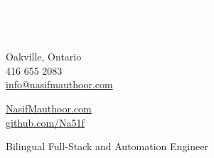 \documentclass[9pt]{src/developercv} %
\begin{document}

\begin{minipage}[t]{0.45\textwidth} %
	\vspace{-\baselineskip} %
	
	\colorbox{SteelBlue4}{{\HUGE\textcolor{white}{\textbf{\MakeUppercase{Nasif}}}}} %
	
	\colorbox{SteelBlue3}{{\HUGE\textcolor{white}{\textbf{\MakeUppercase{Mauthoor}}}}} %
	
	\vspace{6pt}
	
\end{minipage}
\begin{minipage}[t]{0.275\textwidth} %
	\vspace{-\baselineskip} %
	
	{\color{SteelBlue3}\faMapMarker} \hspace{0.2cm} Oakville, Ontario\\
	{\color{SteelBlue4}\faPhone} \hspace{0.2cm} 416 655 2083\\
	{\color{SteelBlue2}\faAt} \hspace{0.2cm} \href{mailto:info@nasifmauthoor.com}{info@nasifmauthoor.com}\\	
\end{minipage}
\begin{minipage}[t]{0.275\textwidth} %
	\vspace{-\baselineskip} %
	
	{\color{SteelBlue3}\faGlobe} \hspace{0.2cm} \href{https://NasifMauthoor.com}{NasifMauthoor.com}\\
	{\color{SteelBlue2}\faGithub} \hspace{0.2cm} \href{https://github.com/Na51f}{github.com/Na51f}\\
\end{minipage}
{\huge Bilingual Full-Stack and Automation Engineer} %
\vspace{0.5cm}
\end{document}
